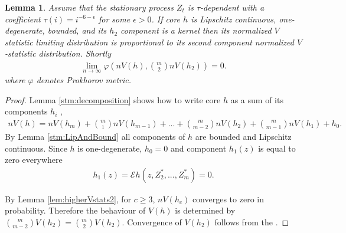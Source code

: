 \documentclass{article} %
\newtheorem{lemma}{Lemma}
\newcommand{\ev}{\mathcal{E}}
\begin{document}
\begin{lemma}
\label{lem:equivVanila}
Assume that the stationary process $Z_t$ is $\tau$-dependent with a coefficient $\tau(i) = i^{-6-\epsilon}$ for some $\epsilon>0$. If core $h$ is Lipschitz continuous, one-degenerate, bounded, and its $h_2$ component is a kernel then its normalized $V$ statistic limiting distribution is proportional to its second component normalized $V$-statistic distribution. Shortly    
\begin{align}
\lim_{n \to \infty} \varphi( n V(h), \binom m 2  n V(h_2) ) = 0. 
\end{align}
where $\varphi$ denotes Prokhorov metric. 
\end{lemma}
\begin{proof}
Lemma \ref{stm:decomposition} shows how to write core  $h$ as a sum of its components $h_i$ ,
\begin{align}
  n V(h) = n V(h_m) + \binom m 1 n V(h_{m-1}) + ...+ \binom {m} {m-2} n V(h_{2}) + \binom {m} {m-1} n V(h_{1})+h_0.
\end{align}
By Lemma \ref{stm:LipAndBound} all components of $h$ are bounded and Lipschitz continuous. Since $h$ is one-degenerate, $h_0=0$ and component $h_1(z)$ is equal to zero everywhere
\begin{align}
h_1(z) = \ev h(z,Z_{2}^*,...,Z_{m}^*)=0. 
\end{align}

By Lemma \ref{lem:higherVstats2}, for $c \geq 3$, $n V(h_{c})$  converges to zero in probability. Therefore the behaviour of $V(h)$ is determined by $\binom {m} {m-2} V(h_2) = \binom {m} {2} V(h_2)$. Convergence of $V(h_2)$ follows from the \cite[Theorem 2.1]{leucht_dependent_2013}.
\end{proof}
\end{document}
